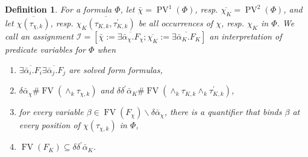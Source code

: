 \documentclass{article}
\newcommand{\assign}{:=}
\newcommand{\tmem}[1]{{\em #1\/}}
\newcommand{\tmop}[1]{\ensuremath{\operatorname{#1}}}
\newtheorem{definition}{Definition}
{\theorembodyfont{\rmfamily}\newtheorem{example}{Example}}
\begin{document}
\begin{definition}
  \label{InterprPredVars}For a formula $\Phi$, let $\bar{\chi} = \tmop{PV}^1
  (\Phi)$, resp. $\overline{\chi_K} = \tmop{PV}^2 (\Phi)$, and let
  $\overline{\chi (\tau_{\chi, k})}$, resp. $\overline{\chi_K (\tau_{K, k},
  \tau_{K, k}^{\prime})}$ be all occurrences of $\chi$, resp. $\chi_K$ in
  $\Phi$. We call an assignment $\mathcal{I}= [\bar{\chi} \assign
  \overline{\exists \bar{\alpha}_{\chi} .F_{\chi}} ; \overline{\chi_K} \assign
  \overline{\exists \bar{\alpha}_K .F_K}]$ an {\tmem{interpretation of
  predicate variables for $\Phi$}} when
  \begin{enumerate}
    \item $\overline{\exists \bar{\alpha}_i .F_i} \overline{\exists
    \bar{\alpha}_j .F_j}$ are solved form formulas,
    
    \item $\delta \bar{\alpha}_{\chi} \# \tmop{FV} (\wedge_k \tau_{\chi, k})$
    and $\delta \delta^{\prime} \bar{\alpha}_K \# \tmop{FV} (\wedge_k \tau_{K,
    k} \wedge_k \tau_{K, k}^{\prime})$,
    
    \item for every variable $\beta \in \tmop{FV} (F_{\chi}) \backslash \delta
    \bar{\alpha}_{\chi}$, there is a quantifier that binds $\beta$ at every
    position of $\chi (\tau_{\chi, k})$ in $\Phi$,
    
    \item $\tmop{FV} (F_K) \subseteq \delta \delta^{\prime} \bar{\alpha}_K$.
  \end{enumerate}
\end{definition}
\end{document}
